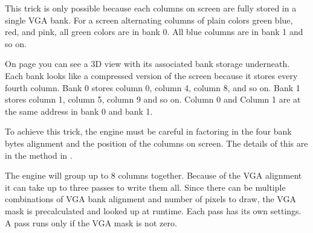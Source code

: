 This trick is only possible because each columns on screen are fully stored in a single VGA bank. For a screen alternating columns of plain colors green blue, red, and pink, all green colors are in bank 0. All blue columns are in bank 1 and so on.\\
\par
{}
 \par
  On page \pageref{vga_layout} you can see a 3D view with its associated bank storage underneath. Each bank looks like a compressed version of the screen because it stores every fourth column. Bank 0 stores column 0, column 4, column 8, and so on. Bank 1 stores column 1, column 5, column 9 and so on. Column 0 and Column 1 are at the same address in bank 0 and bank 1.\\
\par

  \begin{minipage}{\textwidth}
 

\centering
\vspace*{0.3cm}
\label{vga_layout}
\centering


 \end{minipage}

\par
\bigskip
To achieve this trick, the engine must be careful in factoring in the four bank bytes alignment and the position of the columns on screen. The details of this are in the method  in .\\
\par 
\begin{minipage}{\textwidth}

\end{minipage}
The engine will group up to 8 columns together. Because of the VGA alignment it can take up to three passes to write them all. Since there can be multiple combinations of VGA bank alignment and number of pixels to draw, the VGA mask is precalculated and looked up at runtime. Each pass has its own settings. A pass runs only if the VGA mask is not zero.\\

